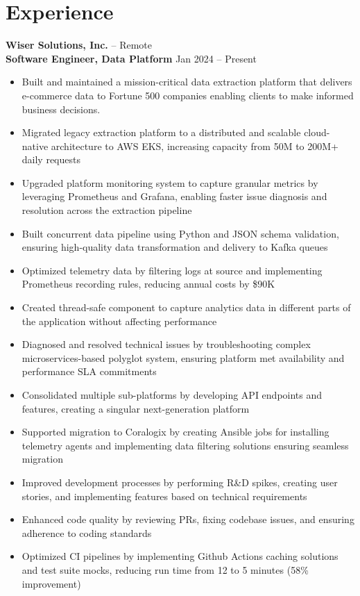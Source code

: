\documentclass[11pt]{article}       %
\begin{document}
\section*{Experience}
\textbf{Wiser Solutions, Inc.} -- Remote \\
\textbf{Software Engineer, Data Platform} \hfill Jan 2024 -- Present \\
\vspace{-9pt}
\begin{itemize}
  \item Built and maintained a mission-critical data extraction platform that delivers e-commerce data to Fortune 500 companies enabling clients to make informed business decisions. \\
  \item Migrated legacy extraction platform to a distributed and scalable cloud-native architecture to AWS EKS, increasing capacity from 50M to 200M+ daily requests \\
  \item Upgraded platform monitoring system to capture granular metrics by leveraging Prometheus and Grafana, enabling faster issue diagnosis and resolution across the extraction pipeline \\
  \item Built concurrent data pipeline using Python and JSON schema validation, ensuring high-quality data transformation and delivery to Kafka queues \\
  \item Optimized telemetry data by filtering logs at source and implementing Prometheus recording rules, reducing annual costs by \$90K \\
  \item Created thread-safe component to capture analytics data in different parts of the application without affecting performance \\
  \item Diagnosed and resolved technical issues by troubleshooting complex microservices-based polyglot system, ensuring platform met availability and performance SLA commitments \\
  \item Consolidated multiple sub-platforms by developing API endpoints and features, creating a singular next-generation platform \\
  \item Supported migration to Coralogix by creating Ansible jobs for installing telemetry agents and implementing data filtering solutions ensuring seamless migration \\
  \item Improved development processes by performing R\&D spikes, creating user stories, and implementing features based on technical requirements \\
  \item Enhanced code quality by reviewing PRs, fixing codebase issues, and ensuring adherence to coding standards \\
  \item Optimized CI pipelines by implementing Github Actions caching solutions and test suite mocks, reducing run time from 12 to 5 minutes (58\% improvement) \\
\end{itemize}
\end{document}
